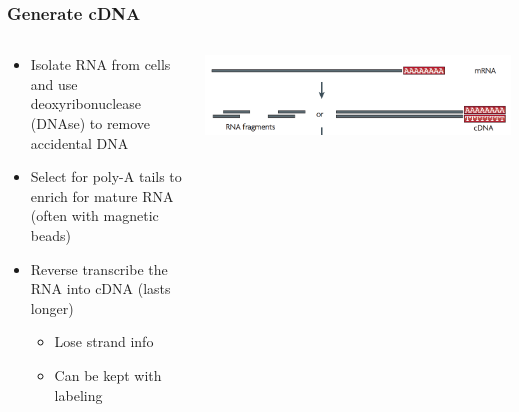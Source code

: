 \documentclass[14pt]{beamer}
\begin{document}
\begin{frame}
\frametitle{Generate cDNA}
\begin{columns}
	\begin{column}{0.5\textwidth}
	\footnotesize
	\begin{itemize}
		\item<+-> Isolate RNA from cells and use deoxyribonuclease (DNAse) to remove accidental DNA
		\item<+-> Select for poly-A tails to enrich for mature RNA (often with magnetic beads)
		\item<+-> Reverse transcribe the RNA into cDNA (lasts longer)
		\begin{itemize}
			\footnotesize
			\item<+-> Lose strand info
			\item<+-> Can be kept with labeling
		\end{itemize}
	\end{itemize}
	\end{column}
	\begin{column}{0.5\textwidth}
	\begin{center}
    	\includegraphics[width=1\textwidth]{images_20170912_cDNA.png}
    \end{center}
	\end{column}
\end{columns}
\end{frame}
\end{document}
